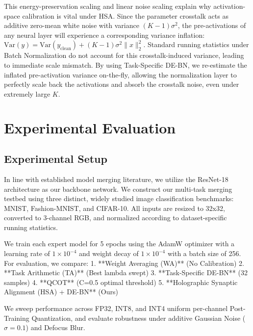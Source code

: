\documentclass{article}
\theoremstyle{plain}
\theoremstyle{definition}
\theoremstyle{remark}
\begin{document}
\enlargethispage{2\baselineskip}

This energy-preservation scaling and linear noise scaling explain why activation-space calibration is vital under HSA. Since the parameter crosstalk acts as additive zero-mean white noise with variance $(K-1)\sigma^2$, the pre-activations of any neural layer will experience a corresponding variance inflation: $\text{Var}(y) = \text{Var}(y_{\text{clean}}) + (K-1)\sigma^2 \|x\|_2^2$. Standard running statistics under Batch Normalization do not account for this crosstalk-induced variance, leading to immediate scale mismatch. By using Task-Specific DE-BN, we re-estimate the inflated pre-activation variance on-the-fly, allowing the normalization layer to perfectly scale back the activations and absorb the crosstalk noise, even under extremely large $K$.

\section{Experimental Evaluation}

\subsection{Experimental Setup}
In line with established model merging literature, we utilize the ResNet-18 architecture as our backbone network. We construct our multi-task merging testbed using three distinct, widely studied image classification benchmarks: MNIST, Fashion-MNIST, and CIFAR-10. All inputs are resized to 32x32, converted to 3-channel RGB, and normalized according to dataset-specific running statistics.

We train each expert model for 5 epochs using the AdamW optimizer with a learning rate of $1 \times 10^{-4}$ and weight decay of $1 \times 10^{-4}$ with a batch size of 256. For evaluation, we compare:
1. **Weight Averaging (WA)** (No Calibration)
2. **Task Arithmetic (TA)** (Best lambda swept)
3. **Task-Specific DE-BN** (32 samples)
4. **QCOT** (C=0.5 optimal threshold)
5. **Holographic Synaptic Alignment (HSA) + DE-BN** (Ours)

We sweep performance across FP32, INT8, and INT4 uniform per-channel Post-Training Quantization, and evaluate robustness under additive Gaussian Noise ($\sigma = 0.1$) and Defocus Blur.
\end{document}
